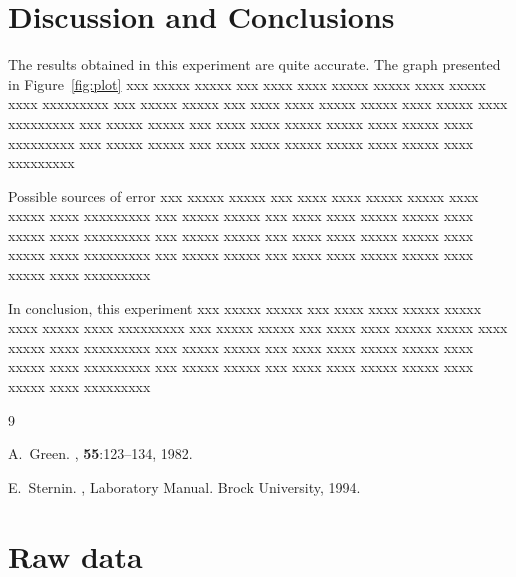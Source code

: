 \documentclass{article}
\begin{document}
\section{Discussion and Conclusions}
The results obtained in this experiment are quite accurate.  The graph 
presented in Figure~\ref{fig:plot}
xxx xxxxx xxxxx xxx xxxx xxxx xxxxx xxxxx xxxx xxxxx xxxx
xxxxxxxxx xxx xxxxx xxxxx xxx xxxx xxxx xxxxx xxxxx xxxx xxxxx xxxx xxxxxxxxx
xxx xxxxx xxxxx xxx xxxx xxxx xxxxx xxxxx xxxx xxxxx xxxx xxxxxxxxx
xxx xxxxx xxxxx xxx xxxx xxxx xxxxx xxxxx xxxx xxxxx xxxx xxxxxxxxx

Possible sources of error 
xxx xxxxx xxxxx xxx xxxx xxxx xxxxx xxxxx xxxx xxxxx xxxx
xxxxxxxxx xxx xxxxx xxxxx xxx xxxx xxxx xxxxx xxxxx xxxx xxxxx xxxx xxxxxxxxx
xxx xxxxx xxxxx xxx xxxx xxxx xxxxx xxxxx xxxx xxxxx xxxx xxxxxxxxx
xxx xxxxx xxxxx xxx xxxx xxxx xxxxx xxxxx xxxx xxxxx xxxx xxxxxxxxx

In conclusion, this experiment 
xxx xxxxx xxxxx xxx xxxx xxxx xxxxx xxxxx xxxx xxxxx xxxx
xxxxxxxxx xxx xxxxx xxxxx xxx xxxx xxxx xxxxx xxxxx xxxx xxxxx xxxx xxxxxxxxx
xxx xxxxx xxxxx xxx xxxx xxxx xxxxx xxxxx xxxx xxxxx xxxx xxxxxxxxx
xxx xxxxx xxxxx xxx xxxx xxxx xxxxx xxxxx xxxx xxxxx xxxx xxxxxxxxx


\begin{thebibliography}{9}

A.~Green.
, {\bf 55}:123--134, 1982.

E.~Sternin.
, Laboratory Manual.
Brock University, 1994.

\end{thebibliography}




\section{Raw data}
\label{app:data}
\end{document}
